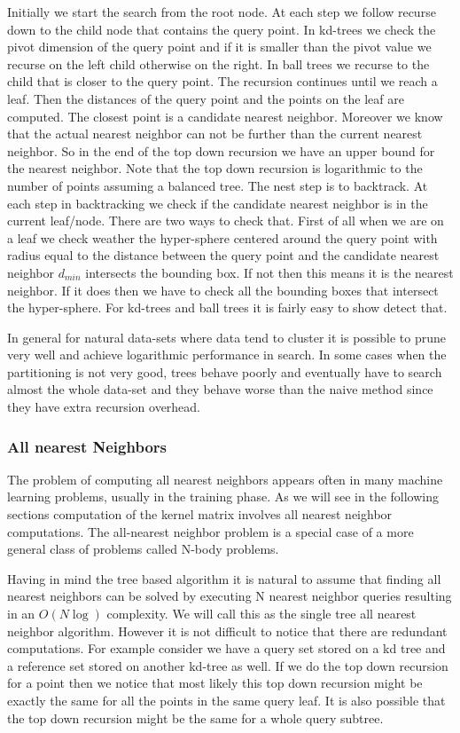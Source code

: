 \documentclass[12pt,letterpaper,doublespaced,ETD,dvips,proposal]{gtthesis}
\begin{document}
\begin{Body}
Initially we start the search from the root node. At each step we
follow recurse down to the child node that contains the query point.
In kd-trees we check the pivot dimension of the query point and if
it is smaller than the pivot value we recurse on the left child
otherwise on the right. In ball trees we recurse to the child that
is closer to the query point. The recursion continues until we reach
a leaf. Then the distances of the query point and the points on the
leaf are computed. The closest point is a candidate nearest
neighbor. Moreover we know that the actual nearest neighbor can not
be further than the current nearest neighbor. So in the end of the
top down recursion we have an upper bound for the nearest neighbor.
Note that the top down recursion is logarithmic to the number of
points assuming a balanced tree. The nest step is to backtrack. At
each step in backtracking we check if the candidate nearest neighbor
is in the current leaf/node. There are two ways to check that. First
of all when we are on a leaf we check weather the hyper-sphere
centered around the query point with radius equal to the distance
 between the query point and the candidate nearest neighbor
 $d_{min}$ intersects the bounding box. If not then this means it is
 the nearest neighbor. If it does then we have to check all the
 bounding boxes that intersect the hyper-sphere. For kd-trees and
 ball trees it is fairly easy to show detect that.

 In general for natural data-sets where data tend to cluster it is
 possible to prune very well  and achieve logarithmic performance in
 search. In some cases when the partitioning is not very good, trees
 behave poorly and eventually have to search almost the whole
 data-set and they behave worse than the naive method since they
 have extra recursion overhead.
\subsubsection{All nearest Neighbors}
The problem of computing all nearest neighbors appears often in many
machine learning problems, usually in the training phase. As we will
see in the following sections computation of the kernel matrix
involves all nearest neighbor computations. The all-nearest neighbor
problem is a special case of a more general class of problems called
N-body problems.

Having in mind the tree based algorithm it is natural to assume that
finding all nearest neighbors can be solved by executing N nearest
neighbor queries resulting in an $O(N\log )$ complexity. We will
call this as the single tree all nearest neighbor algorithm. However
it is not difficult to notice that there are redundant computations.
For example consider we have a query set stored on a kd tree and a
reference set stored on another kd-tree as well. If we do the top
down recursion for a point then we notice that most likely this top
down recursion might be exactly the same for all the points in the
same query leaf. It is also possible that the top down recursion
might be the same for a whole query subtree.


\end{Body}
\end{document}
